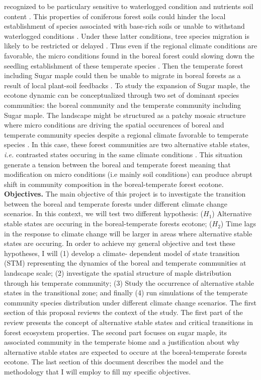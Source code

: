 recognized to be particulary sensitive to waterlogged condition and nutrients
soil content \cite{Moore2008,Lafleur2010,Cleavitt2011}. This properties of
coniferous forest soils could hinder the local establishment of species
associated with base-rich soils or unable to withstand waterlogged conditions
\cite{Lafleur2010}. Under these latter conditions, tree species migration is
likely to be restricted or delayed \cite{Lafleur2010}. Thus even if the
regional climate conditions are favorable, the micro conditions found in the
boreal forest could slowing down the seedling establishment of these temperate
species \cite{Kellman2004,Moore2008,Barras1998,Messier2011}. Then the
temperate forest including Sugar maple could then be unable to migrate in
boreal forests as a result of local plant-soil feedbacks
\cite{McCarthyNeumann2012}. To study the expansion of Sugar maple, the ecotone
dynamic can be conceptualized through two set of dominant species communities:
the boreal community and the temperate community including Sugar maple. The
landscape might be structured as a patchy mosaic structure where micro
conditions are driving the spatial occurences of boreal and temperate
community species despite a regional climate favorable to temperate species
\cite{Goldblum2010,Fisichelli2013}. In this case, these forest communities are
two alternative stable states, \textit{i.e.} contrasted states occuring in the
same climate conditions \cite{scheffer2009critical}. This situation generate a
tension between the boreal and temperate forest meaning that modification on
micro conditions (i.e mainly soil conditions) can produce abrupt shift in
community composition in the boreal-temperate forest ecotone.
\textbf{Objectives.} The main objective of this project is to investigate the
transition between the boreal and temperate forests under different climate
change scenarios. In this context, we will test two different hypothesis:
($H_1$) Alternative stable states are occuring in the boreal-temperate forests
ecotone;  ($H_2$) Time lags in the response to climate change will be larger
in areas where alternative stable states are occuring. In order to achieve my
general objective and test these hypotheses, I will (1) develop a climate-
dependent model of state transition (STM) representing the dynamics of the
boreal and temperate communities at landscape scale; (2) investigate the
spatial structure of maple distribution through his temperate community; (3)
Study the occurrence of alternative stable states in the transitional zone;
and finally (4) run simulations of the temperate community species
distribution under different climate change scenarios. The first section of
this proposal reviews the context of the study. The first part of the review
presents the concept of alternative stable states and critical transitions in
forest ecosystem properties. The second part focuses on sugar maple, its
associated community in the temperate biome and a justification about why
alternative stable states are expected to occure at the boreal-temperate
forests ecotone. The last section of this document describes the model and
the methodology that I will employ to fill my specific objectives. 

